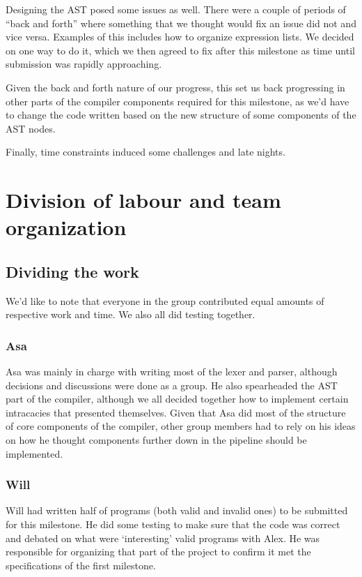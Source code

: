 \documentclass{article}
\begin{document}
Designing the AST posed some issues as well. There were a couple of periods  of
``back and forth'' where something that we thought would fix an issue did not
and vice versa. Examples of this includes how to organize expression lists. We
decided on one way to do it, which we then agreed to fix after this milestone
as time until submission was rapidly approaching.

Given the back and forth nature of our progress, this set us back progressing
in other parts of the compiler components required for this milestone, as we'd
have to change the code written based on the new structure of some components of
the AST nodes.

Finally, time constraints induced some challenges and late nights.

\section{Division of labour and team organization}

\subsection{Dividing the work}

We'd like to note that everyone in the group contributed equal amounts of
respective work and time. We also all did testing together.

\subsubsection{Asa}

Asa was mainly in charge with writing most of the lexer and parser, although
decisions and discussions were done as a group. He also spearheaded the AST part
of the compiler, although we all decided together how to implement certain
intracacies that presented themselves. Given that Asa did most of the structure
of core components of the compiler, other group members had to rely on his ideas
on how he thought components further down in the pipeline should be implemented.

\subsubsection{Will}


Will had written half of programs (both valid and invalid ones) to be
submitted for this milestone. He did some testing to make sure that the code was
correct and debated on what were `interesting' valid programs with Alex.
He was responsible for organizing that part of the project to confirm it
met the specifications of the first milestone.
\end{document}
